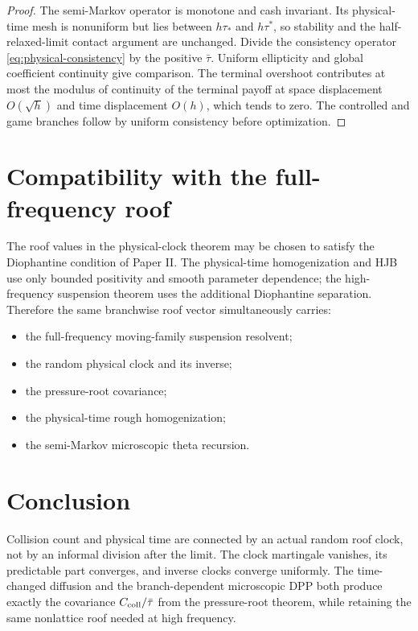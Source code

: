 \documentclass[11pt,reqno]{amsart}
\theoremstyle{definition}
\begin{document}
\begin{proof}
The semi-Markov operator is monotone and cash invariant.  Its physical-time
mesh is nonuniform but lies between $h\tau_*$ and $h\tau^*$, so stability and
the half-relaxed-limit contact argument are unchanged.  Divide the consistency
operator \eqref{eq:physical-consistency} by the positive
$\bar\tau$.  Uniform ellipticity and global coefficient continuity give
comparison.  The terminal overshoot contributes at most the modulus of
continuity of the terminal payoff at space displacement $O(\sqrt h)$ and time
displacement $O(h)$, which tends to zero.  The controlled and game branches
follow by uniform consistency before optimization.
\end{proof}

\section{Compatibility with the full-frequency roof}

The roof values in the physical-clock theorem may be chosen to satisfy the
Diophantine condition of Paper II.  The physical-time homogenization and HJB
use only bounded positivity and smooth parameter dependence; the high-frequency
suspension theorem uses the additional Diophantine separation.  Therefore the
same branchwise roof vector simultaneously carries:

\begin{itemize}
\item the full-frequency moving-family suspension resolvent;
\item the random physical clock and its inverse;
\item the pressure-root covariance;
\item the physical-time rough homogenization;
\item the semi-Markov microscopic theta recursion.
\end{itemize}

\section{Conclusion}

Collision count and physical time are connected by an actual random roof
clock, not by an informal division after the limit.  The clock martingale
vanishes, its predictable part converges, and inverse clocks converge uniformly.
The time-changed diffusion and the branch-dependent microscopic DPP both
produce exactly the covariance $C_{\rm coll}/\bar\tau$ from the pressure-root
theorem, while retaining the same nonlattice roof needed at high frequency.



\end{document}
